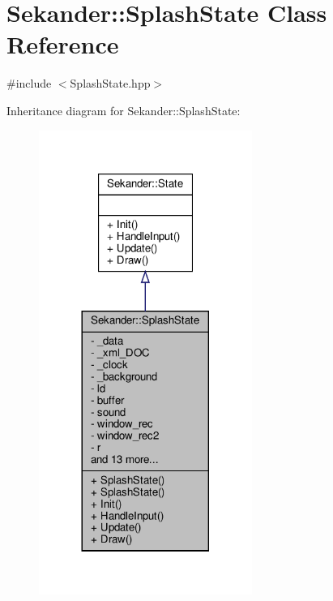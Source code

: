 \hypertarget{classSekander_1_1SplashState}{}\section{Sekander\+:\+:Splash\+State Class Reference}
\label{classSekander_1_1SplashState}


{\ttfamily \#include $<$Splash\+State.\+hpp$>$}



Inheritance diagram for Sekander\+:\+:Splash\+State\+:
\nopagebreak
\begin{figure}[H]
\begin{center}
\leavevmode
\includegraphics[width=197pt]{classSekander_1_1SplashState__inherit__graph}
\end{center}
\end{figure}


